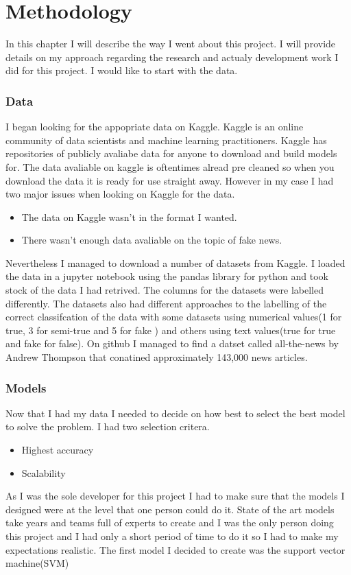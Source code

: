 \chapter{Methodology}
In this chapter I will describe the way I went about this project. I will provide details on my approach regarding the research and actualy development work I did for this project. I would like to start with the data.

\subsection{Data}
I began looking for the appopriate data on Kaggle. Kaggle is an online community of data scientists and machine learning practitioners. Kaggle has repositories of publicly avaliabe data for anyone to download and build models for. The data avaliable on kaggle is oftentimes alread pre cleaned so when you download the data it is ready for use straight away. However in my case I had two major issues when looking on Kaggle for the data.

\begin{itemize}
	\item The data on Kaggle wasn't in the format I wanted.
	\item There wasn't enough data avaliable on the topic of fake news.
\end{itemize}

Nevertheless I managed to download a number of datasets from Kaggle. I loaded the data in a jupyter notebook using the pandas library for python and took stock of the data I had retrived. The columns for the datasets were labelled differently. The datasets also had different approaches to the labelling of the correct classifcation of the data with some datasets using numerical values(1 for true, 3 for semi-true and 5 for fake ) and others using text values(true for true and fake for false). On github I managed to find a datset called all-the-news by Andrew Thompson that conatined approximately 143,000 news articles.


\subsection{Models}
Now that I had my data I needed to decide on how best to select the best model to solve the problem. I had two selection critera.
\begin{itemize}
	\item Highest accuracy
	\item Scalability
\end{itemize}
As I was the sole developer for this project I had to make sure that the models I designed were at the level that one person could do it. State of the art models take years and teams full of experts to create and I was the only person doing this project and I had only a short period of time to do it so I had to make my expectations realistic. The first model I decided to create was the support vector machine(SVM)

